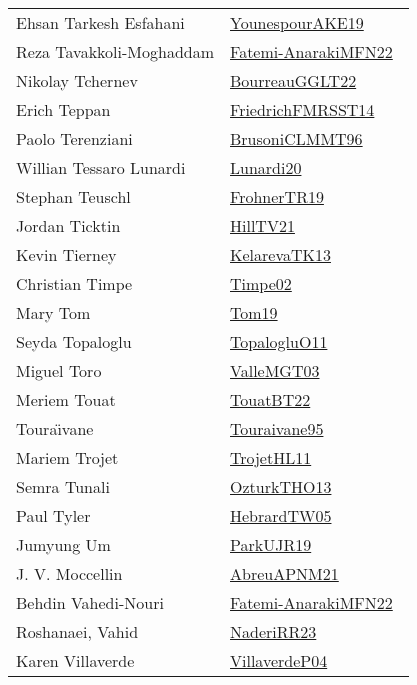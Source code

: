 {\begin{longtable}{p{4cm}p{20cm}}
Ehsan Tarkesh Esfahani & \href{works/YounespourAKE19.pdf}{YounespourAKE19}~\cite{YounespourAKE19}\\
Reza Tavakkoli-Moghaddam & \href{}{Fatemi-AnarakiMFN22}~\cite{Fatemi-AnarakiMFN22}\\
Nikolay Tchernev & \href{works/BourreauGGLT22.pdf}{BourreauGGLT22}~\cite{BourreauGGLT22}\\
Erich Teppan & \href{}{FriedrichFMRSST14}~\cite{FriedrichFMRSST14}\\
Paolo Terenziani & \href{works/BrusoniCLMMT96.pdf}{BrusoniCLMMT96}~\cite{BrusoniCLMMT96}\\
Willian Tessaro Lunardi & \href{}{Lunardi20}~\cite{Lunardi20}\\
Stephan Teuschl & \href{works/FrohnerTR19.pdf}{FrohnerTR19}~\cite{FrohnerTR19}\\
Jordan Ticktin & \href{works/HillTV21.pdf}{HillTV21}~\cite{HillTV21}\\
Kevin Tierney & \href{works/KelarevaTK13.pdf}{KelarevaTK13}~\cite{KelarevaTK13}\\
Christian Timpe & \href{works/Timpe02.pdf}{Timpe02}~\cite{Timpe02}\\
Mary Tom & \href{works/Tom19.pdf}{Tom19}~\cite{Tom19}\\
Seyda Topaloglu & \href{works/TopalogluO11.pdf}{TopalogluO11}~\cite{TopalogluO11}\\
Miguel Toro & \href{works/ValleMGT03.pdf}{ValleMGT03}~\cite{ValleMGT03}\\
Meriem Touat & \href{works/TouatBT22.pdf}{TouatBT22}~\cite{TouatBT22}\\
Toura{\"{\i}}vane & \href{works/Touraivane95.pdf}{Touraivane95}~\cite{Touraivane95}\\
Mariem Trojet & \href{works/TrojetHL11.pdf}{TrojetHL11}~\cite{TrojetHL11}\\
Semra Tunali & \href{works/OzturkTHO13.pdf}{OzturkTHO13}~\cite{OzturkTHO13}\\
Paul Tyler & \href{works/HebrardTW05.pdf}{HebrardTW05}~\cite{HebrardTW05}\\
Jumyung Um & \href{works/ParkUJR19.pdf}{ParkUJR19}~\cite{ParkUJR19}\\
J. V. Moccellin & \href{works/AbreuAPNM21.pdf}{AbreuAPNM21}~\cite{AbreuAPNM21}\\
Behdin Vahedi-Nouri & \href{}{Fatemi-AnarakiMFN22}~\cite{Fatemi-AnarakiMFN22}\\
Roshanaei, Vahid & \href{works/NaderiRR23.pdf}{NaderiRR23}~\cite{NaderiRR23}\\
Karen Villaverde & \href{}{VillaverdeP04}~\cite{VillaverdeP04}\\

\end{longtable}}
